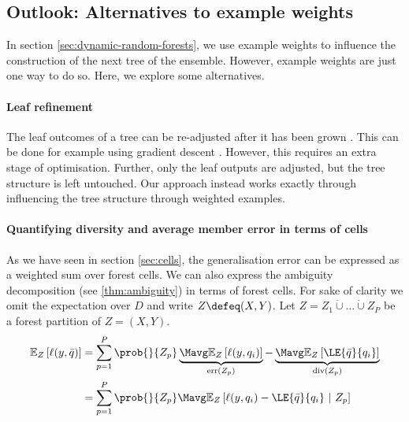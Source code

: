 \documentclass[
    a4paper, %
	fontsize=10pt, %
	twoside=false, %
]{kaobook}
\begin{document}
\begin{titlepage}




\subsection{Outlook: Alternatives to example weights}
In section \ref{sec:dynamic-random-forests}, we use example weights to influence the construction of the next tree of the ensemble. However, example weights are just one way to do so. Here, we explore some alternatives.

\paragraph{Leaf refinement} The leaf outcomes of a tree can be re-adjusted after it has been grown \cite{others}. This can be done for example using gradient descent \cite{buschj-negative-correlation-forests}. However, this requires an extra stage of optimisation. Further, only the leaf outputs are adjusted, but the tree structure is left untouched. Our approach instead works exactly through influencing the tree structure through weighted examples.

\paragraph{Quantifying diversity and average member error in terms of cells} As we have seen in section \ref{sec:cells}, the generalisation error can be expressed as a weighted sum over forest cells. 
We can also express the ambiguity decomposition (see \ref{thm:ambiguity}) in terms of forest cells.
For sake of clarity we omit the expectation over $D$ and write $Z \defeq (X,Y)$.  Let
$Z = Z_{1} \dot\cup \dots \dot\cup Z_{P}$ be a forest partition of $Z=(X,Y)$.
\begin{align*}
\mathbb{E}_{Z}\left[ \ell(y, \bar{q}) \right]  &= \sum_{p=1}^P \prob{}{Z_{p}}  
\underbrace{
\Mavg \mathbb{E}_{Z}\left[ \ell(y,q_{i})  \right] 
 }_{\text{err}(Z_p) }
 -  
 \underbrace{
\Mavg \mathbb{E}_{Z}\left[ \LE{\bar{q}}{q_{i}} \right]   
}_{\text{div}(Z_p) } 
\\
&= \sum_{p=1}^P \prob{}{Z_{p}} \Mavg \mathbb{E}_{Z}\left[ \ell(y,q_{i}) - \LE{\bar{q}}{q_{i}} ~|~ Z_p \right] 
\end{align*}


\end{titlepage}
\end{document}
